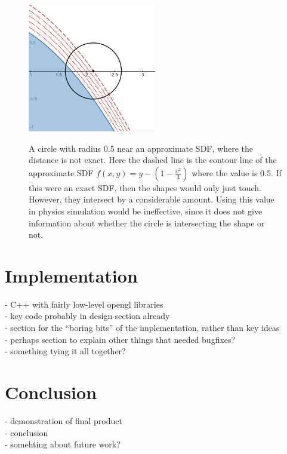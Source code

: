 \documentclass{article}
\begin{document}
\begin{figure}
  \caption{A circle with radius $0.5$ near an approximate SDF, where the distance is not exact. Here the dashed line is the contour line of the approximate SDF $f\left(x,y\right) = y - \left(1 - \frac{x^2}{3}\right)$ where the value is $0.5$. If this were an exact SDF, then the shapes would only just touch. However, they intersect by a considerable amount. Using this value in physics simulation would be ineffective, since it does not give information about whether the circle is intersecting the shape or not.}
  \includegraphics[width=0.5\textwidth]{approx_collision}
  \label{fig:approx_collision}
  \end{figure}
\section{Implementation}
- C++ with fairly low-level opengl libraries\\
- key code probably in design section already\\
- section for the ``boring bits'' of the implementation, rather than key ideas\\
- perhaps section to explain other things that needed bugfixes?\\
- something tying it all together?
  
\section{Conclusion}
 - demonstration of final product\\
 - conclusion\\
 - somehting about future work?



\end{document}
